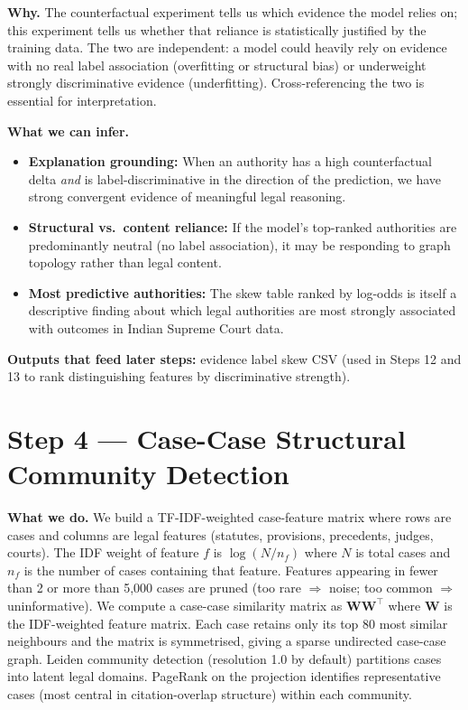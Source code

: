 \documentclass[11pt,a4paper]{article}
\begin{document}
\textbf{Why.}
The counterfactual experiment tells us which evidence the model relies on; this
experiment tells us whether that reliance is statistically justified by the training
data. The two are independent: a model could heavily rely on evidence with no real
label association (overfitting or structural bias) or underweight strongly
discriminative evidence (underfitting). Cross-referencing the two is essential for
interpretation.

\textbf{What we can infer.}
\begin{itemize}
  \item \textbf{Explanation grounding:} When an authority has a high counterfactual
    delta \emph{and} is label-discriminative in the direction of the prediction, we
    have strong convergent evidence of meaningful legal reasoning.
  \item \textbf{Structural vs.\ content reliance:} If the model's top-ranked
    authorities are predominantly neutral (no label association), it may be responding
    to graph topology rather than legal content.
  \item \textbf{Most predictive authorities:} The skew table ranked by log-odds is
    itself a descriptive finding about which legal authorities are most strongly
    associated with outcomes in Indian Supreme Court data.
\end{itemize}

\textbf{Outputs that feed later steps:} evidence label skew CSV (used in Steps 12
and 13 to rank distinguishing features by discriminative strength).

\bigskip

\section{Step 4 \texorpdfstring{\textcolor{stepgray}{---}}{---} Case-Case Structural Community Detection}

\textbf{What we do.}
We build a TF-IDF-weighted case-feature matrix where rows are cases and columns are
legal features (statutes, provisions, precedents, judges, courts). The IDF weight of
feature $f$ is $\log(N / n_f)$ where $N$ is total cases and $n_f$ is the number of
cases containing that feature. Features appearing in fewer than 2 or more than 5,000
cases are pruned (too rare $\Rightarrow$ noise; too common $\Rightarrow$
uninformative). We compute a case-case similarity matrix as $\mathbf{W}\mathbf{W}^\top$
where $\mathbf{W}$ is the IDF-weighted feature matrix. Each case retains only its top
80 most similar neighbours and the matrix is symmetrised, giving a sparse undirected
case-case graph. Leiden community detection (resolution 1.0 by default) partitions
cases into latent legal domains. PageRank on the projection identifies representative
cases (most central in citation-overlap structure) within each community.
\end{document}

